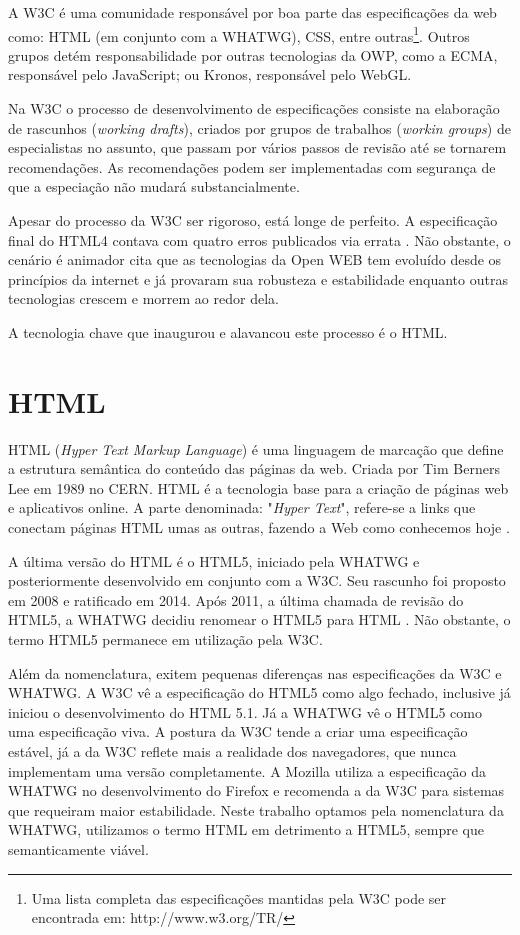 A W3C é uma comunidade responsável por boa parte das
especificações da web como: HTML (em conjunto com a WHATWG), CSS,
entre outras\footnote{Uma lista completa das especificações mantidas pela
W3C pode ser encontrada em: http://www.w3.org/TR/}. Outros grupos
detém responsabilidade por outras tecnologias da OWP, como a ECMA,
responsável pelo JavaScript; ou Kronos, responsável pelo WebGL.

Na W3C o processo de desenvolvimento de especificações consiste
na elaboração de rascunhos (\textit{working drafts}), criados por grupos
de trabalhos (\textit{workin groups}) de especialistas no
assunto, que passam por vários passos de revisão até se tornarem
recomendações. As recomendações podem ser implementadas com
segurança de que a especiação não mudará substancialmente.

Apesar do processo da W3C ser rigoroso, está longe de perfeito. A
especificação final do HTML4 contava com quatro erros publicados
via errata \autocite{HTML5}. Não obstante, o cenário é animador
\autocite{html5mostwanted} cita que as tecnologias da Open WEB tem
evoluído desde os princípios da internet e já provaram sua robusteza
e estabilidade enquanto outras tecnologias crescem e morrem ao redor
dela.

A tecnologia chave que inaugurou e alavancou este processo é o HTML.
\section{HTML}

HTML (\textit{Hyper Text Markup Language}) é uma linguagem de
marcação que define a estrutura semântica do conteúdo das páginas
da web. Criada por Tim Berners Lee em 1989 no CERN. HTML é a tecnologia
base para a criação de páginas web e aplicativos online. A parte
denominada: "\textit{Hyper Text}", refere-se a links que conectam
páginas HTML umas as outras, fazendo a Web como conhecemos hoje
\autocite{mdn2015}.

A última versão do HTML é o HTML5, iniciado pela WHATWG e
posteriormente desenvolvido em conjunto com a W3C. Seu rascunho foi
proposto em 2008 e ratificado em 2014. Após 2011, a última chamada
de revisão do HTML5, a WHATWG decidiu renomear o HTML5 para HTML
\autocite{htmlIsTheNewHtml5}. Não obstante, o termo HTML5 permanece em
utilização pela W3C.

Além da nomenclatura, exitem pequenas diferenças nas especificações
da W3C e WHATWG. A W3C vê a especificação do HTML5 como algo fechado,
inclusive já iniciou o desenvolvimento do HTML 5.1. Já a WHATWG vê o
HTML5 como uma especificação viva. A postura da W3C tende a criar uma
especificação estável, já a da W3C reflete mais a realidade dos
navegadores, que nunca implementam uma versão completamente. A Mozilla
utiliza a especificação da WHATWG no desenvolvimento do Firefox e
recomenda a da W3C para sistemas que requeiram maior estabilidade. Neste
trabalho optamos pela nomenclatura da WHATWG, utilizamos o termo HTML em
detrimento a HTML5, sempre que semanticamente viável.

